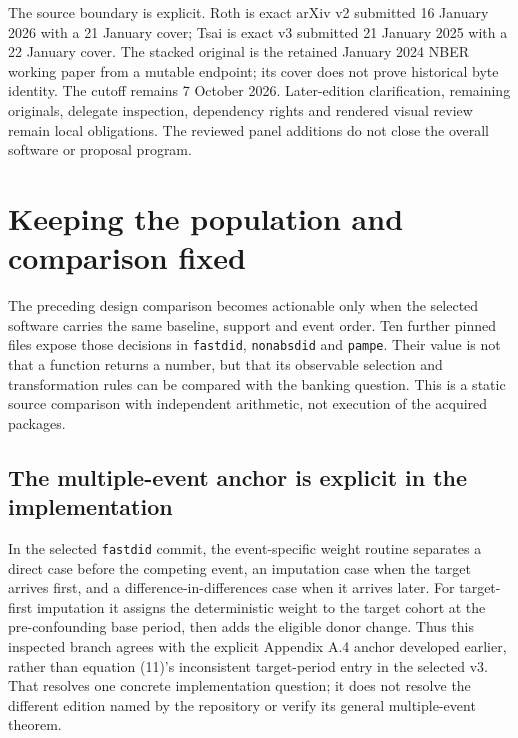 The source boundary is explicit. Roth is exact arXiv v2 submitted 16 January 2026 with a 21 January cover; Tsai is exact
v3 submitted 21 January 2025 with a 22 January cover. The stacked original is the retained January 2024 NBER working paper
from a mutable endpoint; its cover does not prove historical byte identity. The cutoff remains 7 October 2026.
Later-edition clarification, remaining originals, delegate inspection, dependency rights and rendered visual review remain
local obligations. The reviewed panel additions do not close the overall software or proposal program.


\section{Keeping the population and comparison fixed}
\label{sec:exec28-panel-delegates}

The preceding design comparison becomes actionable only when the selected software carries the same baseline, support
and event order. Ten further pinned files expose those decisions in \texttt{fastdid}, \texttt{nonabsdid} and \texttt{pampe}.
Their value is not that a function returns a number, but that its observable selection and transformation rules can be
compared with the banking question. This is a static source comparison with independent arithmetic, not execution of the
acquired packages.~\citep{exec28_panel_delegates}

\subsection{The multiple-event anchor is explicit in the implementation}

In the selected \texttt{fastdid} commit, the event-specific weight routine separates a direct case before the competing
event, an imputation case when the target arrives first, and a difference-in-differences case when it arrives later.
For target-first imputation it assigns the deterministic weight to the target cohort at the pre-confounding base period,
then adds the eligible donor change. Thus this inspected branch agrees with the explicit Appendix A.4 anchor developed
earlier, rather than equation (11)'s inconsistent target-period entry in the selected v3. That resolves one concrete
implementation question; it does not resolve the different edition named by the repository or verify its general
multiple-event theorem.~\citep{exec28_panel_delegates}

